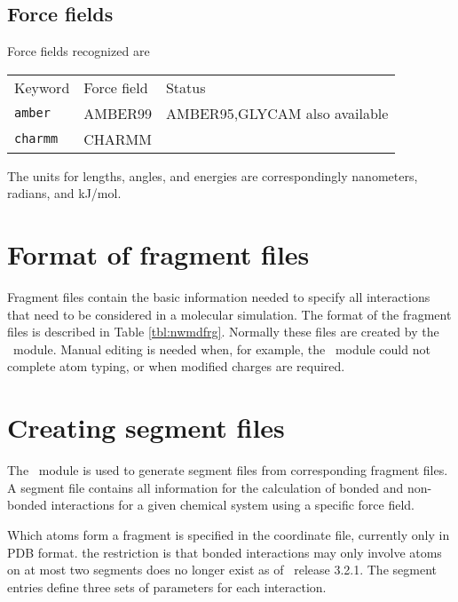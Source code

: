 \subsection{Force fields}
\label{sec:nwaforcefields}
Force fields recognized are
\begin{center}
\begin{tabular}{lll}
\hline
Keyword       & Force field   & Status \\
{\tt amber}   & AMBER99       & AMBER95,GLYCAM also available\\
{\tt charmm}  & CHARMM        & \\
\hline
\end{tabular}
\end{center}  
The units for lengths, angles, and energies are correspondingly
nanometers, radians, and kJ/mol.

\section{Format of fragment files}
Fragment files contain the basic information needed to specify all
interactions that need to be considered in a molecular simulation.
The format of the fragment files is described in Table \ref{tbl:nwmdfrg}.
Normally these files are created by the \prepare\ module. Manual
editing is needed when, for example, the \prepare\ module could not
complete atom typing, or when modified charges are required.

\section{Creating segment files}
\label{sec:nwanwsgm}
The \prepare\ module is used to generate segment files 
from corresponding fragment files. A segment file contains all
information for the calculation of bonded and non-bonded interactions
for a given chemical system using a specific force field.

Which atoms form a fragment is specified in the coordinate file,
currently only in PDB format.
the restriction is that bonded interactions may only involve atoms on at
most two segments does no longer exist as of \nwchem\ release 3.2.1. 
The segment entries define three sets of parameters
for each interaction. 

